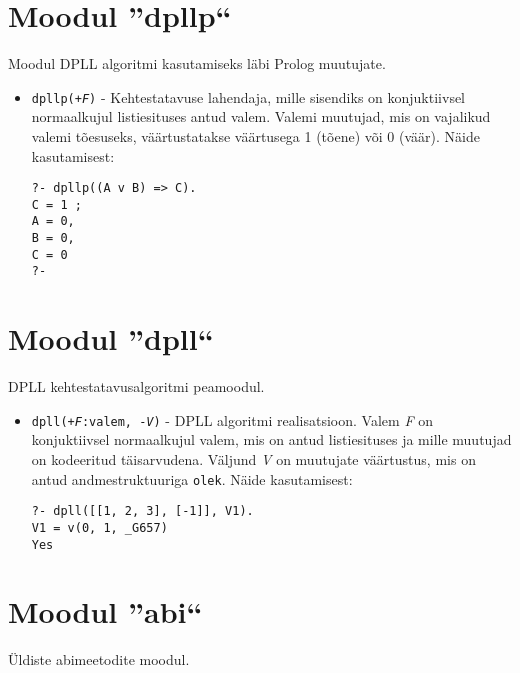 \section{Moodul ''dpllp``}

Moodul DPLL algoritmi kasutamiseks läbi Prolog muutujate.

\begin{itemize}
\item {\tt dpllp(+{\it F})} - Kehtestatavuse lahendaja, mille sisendiks
on konjuktiivsel normaalkujul listiesituses
antud valem. Valemi muutujad, mis on vajalikud
valemi tõesuseks, väärtustatakse väärtusega 1 (tõene)
või 0 (väär).
Näide kasutamisest:

\begin{verbatim}
?- dpllp((A v B) => C).
C = 1 ;
A = 0,
B = 0,
C = 0
?-
\end{verbatim}


\end{itemize}

\section{Moodul ''dpll``}

DPLL kehtestatavusalgoritmi peamoodul.

\begin{itemize}
\item {\tt dpll(+{\it F}:valem, -{\it V})} - DPLL algoritmi realisatsioon. Valem {\it F} on konjuktiivsel
normaalkujul valem, mis on antud listiesituses ja mille
muutujad on kodeeritud täisarvudena. Väljund {\it V} on muutujate
väärtustus, mis on antud andmestruktuuriga {\tt olek}.
Näide kasutamisest:

\begin{verbatim}
?- dpll([[1, 2, 3], [-1]], V1).
V1 = v(0, 1, _G657)
Yes
\end{verbatim}


\end{itemize}

\section{Moodul ''abi``}

Üldiste abimeetodite moodul.

